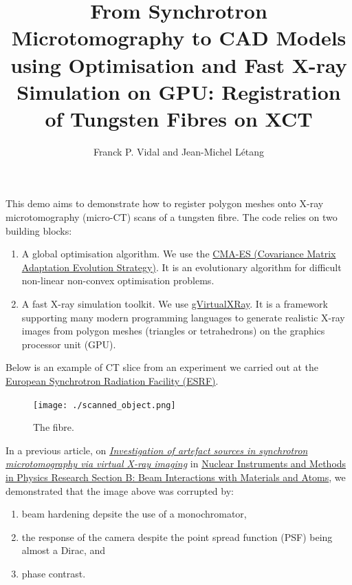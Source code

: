 \documentclass[11pt]{article}
\title{From Synchrotron Microtomography to CAD Models using
Optimisation and Fast X-ray Simulation on
GPU: Registration of Tungsten Fibres on XCT}
\author{Franck P. Vidal and Jean-Michel L\'etang}
\providecommand{\tightlist}{%
      \setlength{\itemsep}{0pt}\setlength{\parskip}{0pt}}
\begin{document}
    
    \maketitle
    
    

    

This demo aims to demonstrate how to register polygon meshes onto X-ray
microtomography (micro-CT) scans of a tungsten fibre. The code relies on
two building blocks:

\begin{enumerate}
\def\labelenumi{\arabic{enumi}.}
\tightlist
\item
  A global optimisation algorithm. We use the
  \href{http://cma.gforge.inria.fr/http://cma.gforge.inria.fr/}{CMA-ES
  (Covariance Matrix Adaptation Evolution Strategy)}. It is an
  evolutionary algorithm for difficult non-linear non-convex
  optimisation problems.
\item
  A fast X-ray simulation toolkit. We use
  \href{http://gvirtualxray.sourceforge.net/}{gVirtualXRay}. It is a
  framework supporting many modern programming languages to generate
  realistic X-ray images from polygon meshes (triangles or tetrahedrons)
  on the graphics processor unit (GPU).
\end{enumerate}

Below is an example of CT slice from an experiment we carried out at the
\href{https://www.esrf.fr/https://www.esrf.fr/}{European Synchrotron
Radiation Facility (ESRF)}.

\begin{figure}
\centering
\texttt{[image: ./scanned\_object.png]}
\caption{The fibre.}
\end{figure}

In a previous article, on
\href{https://doi.org/10.1016/j.nimb.2005.02.003}{\emph{Investigation of
artefact sources in synchrotron microtomography via virtual X-ray
imaging}} in
\href{https://www.sciencedirect.com/journal/nuclear-instruments-and-methods-in-physics-research-section-b-beam-interactions-with-materials-and-atoms}{Nuclear
Instruments and Methods in Physics Research Section B: Beam Interactions
with Materials and Atoms}, we demonstrated that the image above was
corrupted by:

\begin{enumerate}
\def\labelenumi{\arabic{enumi})}
\tightlist
\item
  beam hardening depsite the use of a monochromator,
\item
  the response of the camera despite the point spread function (PSF)
  being almost a Dirac, and
\item
  phase contrast.
\end{enumerate}
\end{document}
